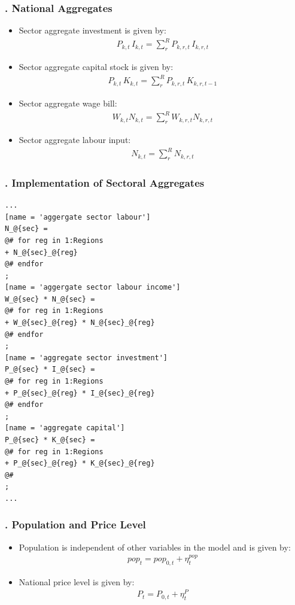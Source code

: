\documentclass[11pt,aspectratio=169]{beamer}
\begin{document}
\begin{frame}
\frametitle{{\thesection.\thesubsection} National Aggregates}
\scriptsize
\begin{itemize}
\item Sector aggregate investment is given by:
\begin{align*}
P_{k,t} \, I_{k,t} = \sum_{r}^{R} P_{k,r,t} \, I_{k,r,t}
\end{align*}
\item Sector aggregate capital stock is given by:
\begin{align*}
P_{k,t} \, K_{k,t} = \sum_{r}^{R} P_{k,r,t} \, K_{k,r,t-1}
\end{align*}
\item Sector aggregate wage bill:
\begin{align*}
W_{k,t} N_{k,t} = \sum_{r}^{R}  W_{k,r,t} N_{k,r,t}
\end{align*}
\item Sector aggregate labour input:
\begin{align*}
N_{k,t} = \sum_{r}^{R} N_{k,r,t}
\end{align*}
\end{itemize}
\end{frame}

\begin{frame}[fragile]
\frametitle{{\thesection.\thesubsection} Implementation of Sectoral Aggregates}

\begin{lstlisting}[frame = single]
...
[name = 'aggergate sector labour']
N_@{sec} = 
@# for reg in 1:Regions
+ N_@{sec}_@{reg}
@# endfor
;
[name = 'aggergate sector labour income']
W_@{sec} * N_@{sec} = 
@# for reg in 1:Regions
+ W_@{sec}_@{reg} * N_@{sec}_@{reg}
@# endfor
;
[name = 'aggregate sector investment']
P_@{sec} * I_@{sec} = 
@# for reg in 1:Regions
+ P_@{sec}_@{reg} * I_@{sec}_@{reg}
@# endfor
;
[name = 'aggregate capital']
P_@{sec} * K_@{sec} = 
@# for reg in 1:Regions
+ P_@{sec}_@{reg} * K_@{sec}_@{reg}
@#
;
...
\end{lstlisting}
\end{frame}


\begin{frame}
\frametitle{{\thesection.\thesubsection} Population and Price Level}
\scriptsize
\begin{itemize}
\item Population is independent of other variables in the model and is given by:
\begin{align*}
pop_{t} = pop_{0,t} + \eta^{pop}_{t}
\end{align*}
\item National price level is given by:
\begin{align*}
P_{t} = P_{0,t} + \eta^{P}_{t}
\end{align*}
\end{itemize}
\end{frame}
\end{document}
